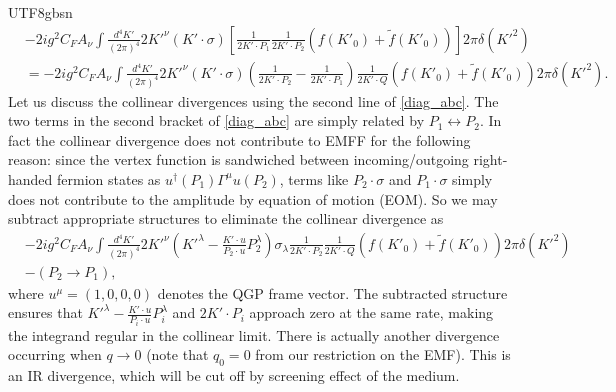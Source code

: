 \documentclass[11pt]{article}\def\baselinestretch{1.4}
\def\G{{\Gamma}}
\def\m{{\mu}}
\def\s{{\sigma}}
\def\({\left(}
\def\){\right)}
\newcommand{\dg}{\dagger}
\begin{document}
\begin{CJK}{UTF8}{gbsn}
\begin{align}\label{diag_abc}
   &-2ig^2C_F A_\nu \int\frac{d^{4} K'}{( 2\pi )^{4}} 2K'^\nu (K' \cdot \sigma) \left[ \frac{1}{2K'\cdot P_1}\frac{1}{2K'\cdot P_2}\(f(K'_0)+\tilde{f}(K'_0)\) \right]2\pi \delta (K'^2) \nonumber\\
   &=-2ig^2C_F A_\nu \int\frac{d^{4} K'}{( 2\pi )^{4}} 2K'^\nu (K' \cdot \sigma)\left(\frac{1}{2K'\cdot P_2}-\frac{1}{2K'\cdot P_1}\right)\frac{1}{2K'\cdot Q}\left(f(K'_0)+\tilde{f}(K'_0)\right)2\pi \delta (K'^2). %
\end{align}
Let us discuss the collinear divergences using the second line of \eqref{diag_abc}. The two terms in the second bracket of \eqref{diag_abc} are simply related by $P_1\leftrightarrow P_2$. In fact the collinear divergence does not contribute to EMFF for the following reason: since the vertex function is sandwiched between incoming/outgoing right-handed fermion states as $u^\dg(P_1)\G^\m u(P_2)$, terms like $P_2\cdot \s$ and $P_1\cdot \s$ simply does not contribute to the amplitude by equation of motion (EOM). So we may subtract appropriate structures to eliminate the collinear divergence as
\begin{align}
&-2ig^2C_F A_\nu \int\frac{d^{4} K'}{( 2\pi )^{4}} 2 K'^\nu \left(K'^\lambda -\frac{K' \cdot u}{P_2 \cdot u}P_2^\lambda \right) \sigma_\lambda
\frac{1}{2K'\cdot P_2}\frac{1}{2K'\cdot Q}\left(f(K'_0)+\tilde{f}(K'_0)\right)2\pi \delta (K'^2)\nonumber\\
&-(P_2\to P_1) ,\label{integral_with_counterterm}
\end{align}
where $u^\mu =(1, 0, 0, 0)$ denotes the QGP frame vector. The subtracted structure ensures that $K'^\lambda -\frac{K' \cdot u}{P_{i} \cdot u}P_{i}^\lambda$ and $2K'\cdot P_{i}$ approach zero at the same rate, making the integrand regular in the collinear limit. There is actually another divergence occurring when $q\to0$ (note that $q_0=0$ from our restriction on the EMF). This is an IR divergence, which will be cut off by screening effect of the medium.


\end{CJK}
\end{document}
